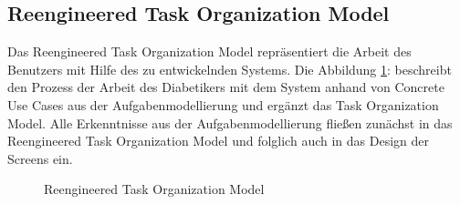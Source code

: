 \subsection{Reengineered Task Organization Model}
Das Reengineered Task Organization Model repräsentiert die Arbeit des Benutzers mit Hilfe des zu entwickelnden Systems. Die Abbildung \ref{img:reengineeredTaskOrganizationModel}: \glqq {}\grqq{} beschreibt den Prozess der Arbeit des Diabetikers mit dem System anhand von Concrete Use Cases aus der Aufgabenmodellierung und ergänzt das Task Organization Model. Alle Erkenntnisse aus der Aufgabenmodellierung fließen zunächst in das Reengineered Task Organization Model und folglich auch in das Design der Screens ein.
\begin{figure}[H]
	\centering
	\setlength{\fboxsep}{1pt}
	\setlength{\fboxrule}{1pt}
	\captionsetup{justification=centering}
	\caption{Reengineered Task Organization Model}
	\label{img:reengineeredTaskOrganizationModel}
\end{figure}

